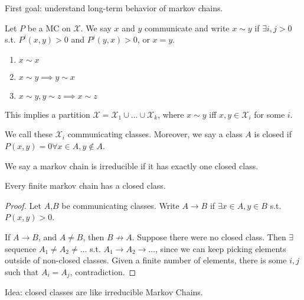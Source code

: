 First goal: understand long-term behavior of markov chains. 

\begin{definition}

Let $P$ be a MC on $\mathcal{X}$. We say $x$ and $y$ \ac{communicate} and write $x\sim y$ if $\exists i,j > 0$ s.t. $P^i(x,y) > 0$ and $P^j(y,x) > 0$, or $x=y$. 
\end{definition}

\begin{theorem}

\begin{enumerate}
    \item $x\sim x$
    \item $x\sim y\implies y\sim x$
    \item $x\sim y, y\sim z\implies x\sim z$
\end{enumerate}
\end{theorem}

This implies a partition $\mathcal{X} = \mathcal{X}_1\cup \hdots \cup \mathcal{X}_k$, where $x\sim y$ iff $x,y\in \mathcal{X}_i$ for some $i$. 

\begin{definition}

We call these $\mathcal{X}_i$ \ac{communicating classes}. Moreover, we say a class $A$ is \ac{closed} if $P(x,y) = 0\forall x\in A, y\notin A$. 
\end{definition}

\begin{definition}

We say a markov chain is \ac{irreducible} if it has exactly one closed class. 
\end{definition}

\begin{theorem}
\proplabel

Every finite markov chain has a closed class. 
\end{theorem}

\begin{proof}
Let $A$,$B$ be communicating classes. Write $A\rightarrow B$ if $\exists x\in A, y\in B$ s.t. $P(x,y) > 0$. 

If $A\rightarrow B$, and $A\neq B$, then $B\not\rightarrow A$. Suppose there were no closed class. Then $\exists$ sequence $A_1\neq A_2\neq \hdots$ s.t. $A_1\rightarrow A_2\rightarrow \hdots$, since we can keep picking elements outside of non-closed classes. Given a finite number of elements, there is some $i,j$ such that $A_i=A_j$, contradiction.   
\end{proof}

Idea: closed classes are like irreducible Markov Chains. 
